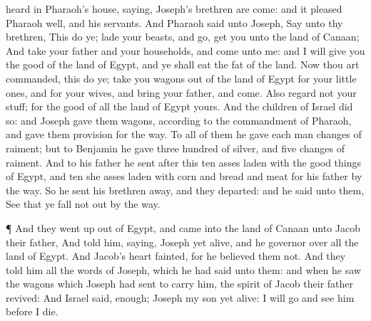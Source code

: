 {heard in
Pharaoh’s
house,
saying,
Joseph’s
brethren are
come: and it
pleased
Pharaoh
well,
and his
servants.
And
Pharaoh
said unto
Joseph,
Say unto thy
brethren, This
do ye;
lade your
beasts, and
go,
get you unto the
land of
Canaan;
And
take your
father and your
households, and
come unto me: and I will
give you the
good of the
land of
Egypt, and ye shall
eat the
fat of the
land.
Now thou art
commanded, this
do ye;
take you
wagons out of the
land of
Egypt for your little
ones, and for your
wives, and
bring your
father, and
come.
Also
regard not your
stuff; for the
good of all the
land of
Egypt
{} yours.
And the
children of
Israel
did so: and
Joseph
gave them
wagons, according to the
commandment of
Pharaoh, and
gave them
provision for the
way.
To all of them he
gave each
man
changes of
raiment; but to
Benjamin he
gave
three
hundred
{} of
silver, and
five
changes of
raiment.
And to his
father he
sent after
this
{}
ten
asses
laden with the good
things of
Egypt, and
ten she
asses
laden with
corn and
bread and
meat for his
father by the
way.
So he
sent his
brethren
away, and they
departed: and he
said unto them, See that ye fall not
out by the
way.
\par }{\PP {}¶ And they went
up out of
Egypt, and
came into the
land of
Canaan unto
Jacob their
father,
And
told him,
saying,
Joseph
{} yet
alive, and he
{}
governor over all the
land of
Egypt. And
Jacob’s heart
fainted, for he
believed them not.
And they
told him all the
words of
Joseph, which he had
said unto them: and when he
saw the
wagons which
Joseph had
sent to
carry him, the
spirit of
Jacob their
father
revived:
And
Israel
said,
{}
enough;
Joseph my
son
{} yet
alive: I will
go and see
him before I
die.

}
